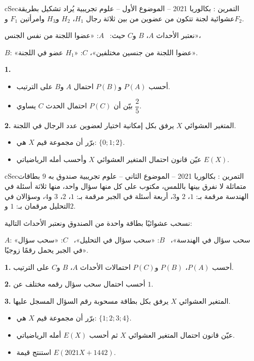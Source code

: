 \documentclass[12pt,a4paper]{article}
\newenvironment{BOX}[2]{\begin{otherlanguage}{english}\begin{arbox}{#1}{#2}}{\end{arbox}\end{otherlanguage}}
\newcounter{exo}
\newenvironment{tamrin}[1]{\stepcounter{exo}\begin{BOX}{cSec}{التمرين \theexo: #1}}{\end{BOX}}
\newenvironment{sq}{\begin{itemize}[leftmargin=2.4em,itemsep=3pt]}{\end{itemize}}
\newcommand{\qa}{\item[(أ)]}\newcommand{\qb}{\item[(ب)]}\newcommand{\qc}{\item[(جـ)]}\newcommand{\qd}{\item[(د)]}\newcommand{\qe}{\item[(هـ)]}
\newcommand{\QQ}[1]{\par\smallskip\textbf{#1.} }
\begin{document}
\begin{tamrin}{بكالوريا 2021 -- الموضوع الأول -- علوم تجريبية}
يُراد تشكيل بطريقة عشوائية لجنة تتكون من عضوين من بين ثلاثة رجال $H_1$، $H_2$ و$H_3$ وامرأتين $F_1$ و$F_2$.

نعتبر الأحداث $A$، $B$ و$C$ حيث: \ $A$: «عضوا اللجنة من نفس الجنس»،

$B$: «عضوا اللجنة من جنسين مختلفين»، \quad $C$: «$H_1$ عضو في اللجنة».
\QQ{1}
\begin{sq}
\qa أحسب $P(A)$ و$P(B)$ احتمال $A$ و$B$ على الترتيب.
\qb بيّن أن $P(C)$ احتمال الحدث $C$ يساوي $\dfrac25$.
\end{sq}
\QQ{2} المتغير العشوائي $X$ يرفق بكل إمكانية اختيار لعضوين عدد الرجال في اللجنة.
\begin{sq}
\qa برّر أن مجموعة قيم $X$ هي: $\{0;1;2\}$.
\qb عيّن قانون احتمال المتغير العشوائي $X$ وأحسب أمله الرياضياتي $E(X)$.
\end{sq}
\end{tamrin}

\begin{tamrin}{بكالوريا 2021 -- الموضوع الثاني -- علوم تجريبية}
صندوق به $9$ بطاقات متماثلة لا نفرق بينها باللمس، مكتوب على كل منها سؤال واحد، منها ثلاثة أسئلة في الهندسة مرقمة بـ: $1$، $2$ و$3$، أربعة أسئلة في الجبر مرقمة بـ: $1$، $2$، $3$ و$4$، وسؤالان في التحليل مرقمان بـ: $1$ و$2$.

نسحب عشوائيًا بطاقة واحدة من الصندوق ونعتبر الأحداث التالية:

$A$: «سحب سؤال في الهندسة»، \ $B$: «سحب سؤال في التحليل»، \ $C$: «سحب سؤال في الجبر يحمل رقمًا زوجيًا».
\QQ{1} أحسب $P(A)$، $P(B)$ و$P(C)$ احتمالات الأحداث $A$، $B$ و$C$ على الترتيب.
\QQ{2} أحسب احتمال سحب سؤال رقمه مختلف عن $1$.
\QQ{3} المتغير العشوائي $X$ يرفق بكل بطاقة مسحوبة رقم السؤال المسجل عليها.
\begin{sq}
\qa برّر أن مجموعة قيم $X$ هي: $\{1;2;3;4\}$.
\qb عيّن قانون احتمال المتغير العشوائي $X$ ثم أحسب $E(X)$ أمله الرياضياتي.
\qc استنتج قيمة $E(2021X+1442)$.
\end{sq}
\end{tamrin}
\end{document}
